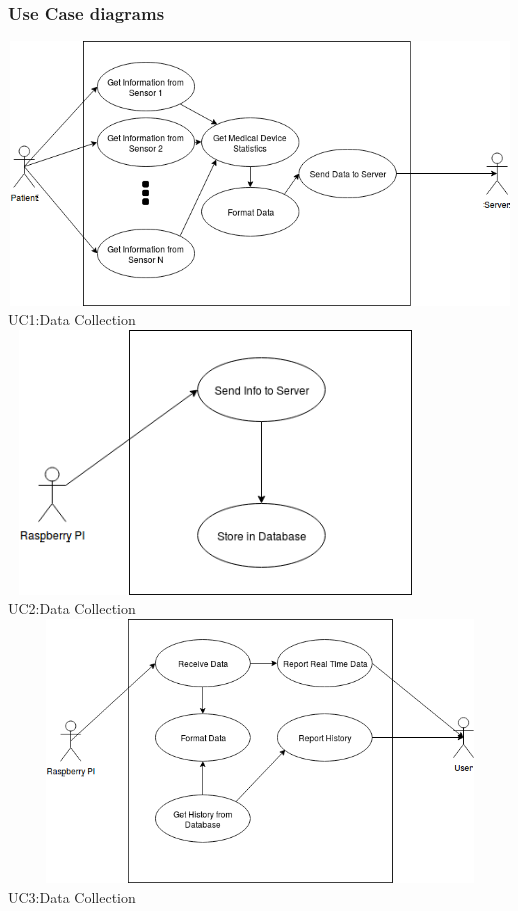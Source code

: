 \subsubsection{Use Case diagrams}

\centering
\includegraphics[width=15cm, height=7cm]{Diagrams/UseCase1.png}
UC1:Data Collection
\\

\centering
\includegraphics[width=11cm, height=7cm]{Diagrams/UseCase2.png}
\\
UC2:Data Collection
\\

\centering
\includegraphics[width=15cm, height=7cm]{Diagrams/UseCase3.png}
UC3:Data Collection
\\

